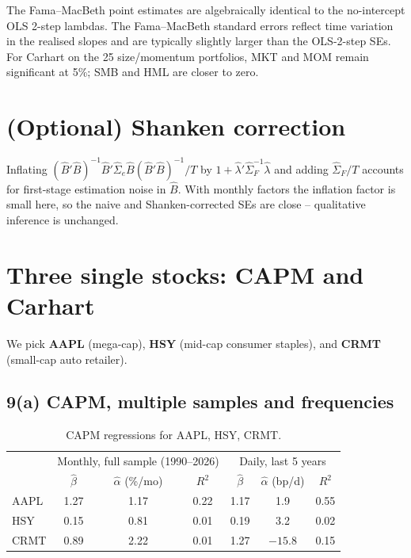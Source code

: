\documentclass[11pt,letterpaper]{article}
\begin{document}
The Fama--MacBeth point estimates are algebraically identical to the no-intercept OLS
2-step lambdas. The Fama--MacBeth standard errors reflect time variation in the realised
slopes and are typically slightly larger than the OLS-2-step SEs. For Carhart on the 25
size/momentum portfolios, MKT and MOM remain significant at 5\%; SMB and HML are closer
to zero.

\section{(Optional) Shanken correction}

Inflating $(\hat B'\hat B)^{-1}\hat B'\hat\Sigma_e\hat B(\hat B'\hat B)^{-1}/T$ by
$1+\hat\lambda'\hat\Sigma_F^{-1}\hat\lambda$ and adding $\hat\Sigma_F/T$ accounts for
first-stage estimation noise in $\hat B$. With monthly factors the inflation factor is
small here, so the naive and Shanken-corrected SEs are close -- qualitative inference is
unchanged.

\section{Three single stocks: CAPM and Carhart}

We pick \textbf{AAPL} (mega-cap), \textbf{HSY} (mid-cap consumer staples), and
\textbf{CRMT} (small-cap auto retailer).

\subsection*{9(a) CAPM, multiple samples and frequencies}

\begin{table}[h]
\centering
\caption{CAPM regressions for AAPL, HSY, CRMT.}
\begin{tabular}{lccc|ccc}
\toprule
& \multicolumn{3}{c|}{Monthly, full sample (1990--2026)} & \multicolumn{3}{c}{Daily, last 5 years} \\
& $\hat\beta$ & $\hat\alpha$ (\%/mo) & $R^2$ & $\hat\beta$ & $\hat\alpha$ (bp/d) & $R^2$ \\
\midrule
AAPL & 1.27 & 1.17 & 0.22 & 1.17 &  1.9 & 0.55 \\
HSY  & 0.15 & 0.81 & 0.01 & 0.19 &  3.2 & 0.02 \\
CRMT & 0.89 & 2.22 & 0.01 & 1.27 & $-15.8$ & 0.15 \\
\bottomrule
\end{tabular}
\end{table}
\end{document}
